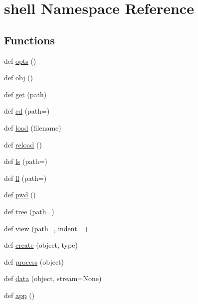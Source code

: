 \hypertarget{namespaceshell}{}\section{shell Namespace Reference}
\label{namespaceshell}
\subsection*{Functions}
\begin{DoxyCompactItemize}
\item 
def \hyperlink{namespaceshell_ac20d6d8d358a08b077ebca4dc98eca96}{opts} ()
\item 
def \hyperlink{namespaceshell_a7c2aab80550f476d91e0d8f0c350a635}{obj} ()
\item 
def \hyperlink{namespaceshell_a4b477089a422d9adc38334764718c485}{get} (path)
\item 
def \hyperlink{namespaceshell_a407fefdfad7caab50f7b0eabd9ddbf55}{cd} (path=\textquotesingle{}\textquotesingle{})
\item 
def \hyperlink{namespaceshell_af9ea9dab4000d08fadcd5fed31b64911}{load} (filename)
\item 
def \hyperlink{namespaceshell_a406c1a03890c85fe979d6d8e540b3bdf}{reload} ()
\item 
def \hyperlink{namespaceshell_aa9b05ca51c55671aa9ce6973d3c68049}{ls} (path=\textquotesingle{}\textquotesingle{})
\item 
def \hyperlink{namespaceshell_a739d025c0779dd20066ec2f61b0513aa}{ll} (path=\textquotesingle{}\textquotesingle{})
\item 
def \hyperlink{namespaceshell_ac92525a6872e660926b18f1047e21ee7}{pwd} ()
\item 
def \hyperlink{namespaceshell_aee4ac95f90c385c4fa8e9cd13ce2380d}{tree} (path=\textquotesingle{}\textquotesingle{})
\item 
def \hyperlink{namespaceshell_aebe5a080b6d651f77ca73d69a425f126}{view} (path=\textquotesingle{}\textquotesingle{}, indent=\textquotesingle{} \textquotesingle{})
\item 
def \hyperlink{namespaceshell_a4e7ade568694b57b3284d8b323ac9ecd}{create} (object, type)
\item 
def \hyperlink{namespaceshell_ae1ffb966b730c62592e1093acd8d9e29}{process} (object)
\item 
def \hyperlink{namespaceshell_a5ea2525995cedc3efd69ea8a7f034d1e}{data} (object, stream=None)
\item 
def \hyperlink{namespaceshell_a79f68caaf52d03ff793360cebe45cc22}{app} ()

\end{DoxyCompactItemize}
